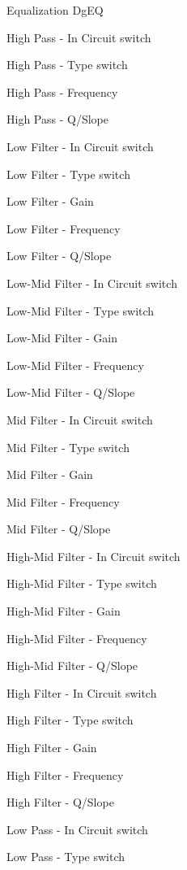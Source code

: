 \begin{DoxyItemize}
\item Equalization {\ttfamily \textquotesingle{}Dg\+EQ\textquotesingle{}}  
\begin{DoxyEnumerate}
\item High Pass -\/ In Circuit switch  
\item High Pass -\/ Type switch  
\item High Pass -\/ Frequency  
\item High Pass -\/ Q/\+Slope  
\item Low Filter -\/ In Circuit switch  
\item Low Filter -\/ Type switch  
\item Low Filter -\/ Gain  
\item Low Filter -\/ Frequency  
\item Low Filter -\/ Q/\+Slope  
\item Low-\/\+Mid Filter -\/ In Circuit switch  
\item Low-\/\+Mid Filter -\/ Type switch  
\item Low-\/\+Mid Filter -\/ Gain  
\item Low-\/\+Mid Filter -\/ Frequency  
\item Low-\/\+Mid Filter -\/ Q/\+Slope  
\item Mid Filter -\/ In Circuit switch  
\item Mid Filter -\/ Type switch  
\item Mid Filter -\/ Gain  
\item Mid Filter -\/ Frequency  
\item Mid Filter -\/ Q/\+Slope  
\item High-\/\+Mid Filter -\/ In Circuit switch  
\item High-\/\+Mid Filter -\/ Type switch  
\item High-\/\+Mid Filter -\/ Gain  
\item High-\/\+Mid Filter -\/ Frequency  
\item High-\/\+Mid Filter -\/ Q/\+Slope  
\item High Filter -\/ In Circuit switch  
\item High Filter -\/ Type switch  
\item High Filter -\/ Gain  
\item High Filter -\/ Frequency  
\item High Filter -\/ Q/\+Slope  
\item Low Pass -\/ In Circuit switch  
\item Low Pass -\/ Type switch  

\end{DoxyEnumerate}
\end{DoxyItemize}
